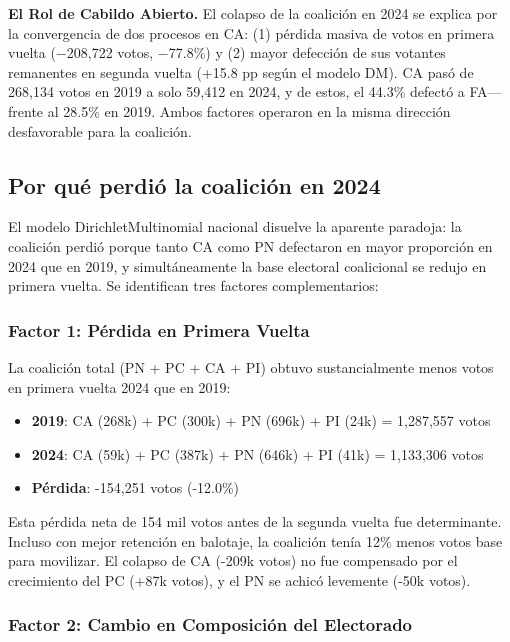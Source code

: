 \textbf{El Rol de Cabildo Abierto.} El colapso de la coalición en 2024 se explica por la convergencia de dos procesos en CA: (1) pérdida masiva de votos en primera vuelta ($-$208{,}722 votos, $-$77.8\%) y (2) mayor defección de sus votantes remanentes en segunda vuelta (+15.8 pp según el modelo DM). CA pasó de 268{,}134 votos en 2019 a solo 59{,}412 en 2024, y de estos, el 44.3\% defectó a FA---frente al 28.5\% en 2019. Ambos factores operaron en la misma dirección desfavorable para la coalición.

\subsection{Por qué perdió la coalición en 2024}
\label{sec:paradoja_colapso}

El modelo DirichletMultinomial nacional disuelve la aparente paradoja: la coalición perdió porque tanto CA como PN defectaron en mayor proporción en 2024 que en 2019, y simultáneamente la base electoral coalicional se redujo en primera vuelta. Se identifican tres factores complementarios:

\subsubsection{Factor 1: Pérdida en Primera Vuelta}

La coalición total (PN + PC + CA + PI) obtuvo sustancialmente menos votos en primera vuelta 2024 que en 2019:

\begin{itemize}
    \item \textbf{2019}: CA (268k) + PC (300k) + PN (696k) + PI (24k) = 1,287,557 votos
    \item \textbf{2024}: CA (59k) + PC (387k) + PN (646k) + PI (41k) = 1,133,306 votos
    \item \textbf{Pérdida}: -154,251 votos (-12.0\%)
\end{itemize}

Esta pérdida neta de 154 mil votos antes de la segunda vuelta fue determinante. Incluso con mejor retención en balotaje, la coalición tenía 12\% menos votos base para movilizar. El colapso de CA (-209k votos) no fue compensado por el crecimiento del PC (+87k votos), y el PN se achicó levemente (-50k votos).

\subsubsection{Factor 2: Cambio en Composición del Electorado}

